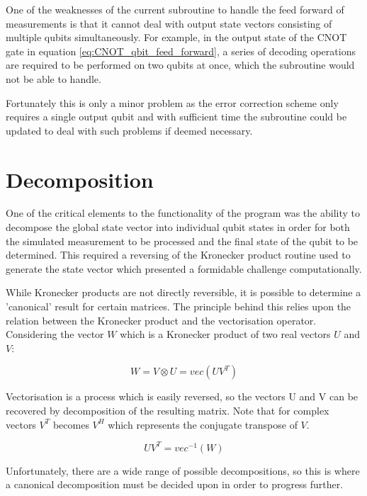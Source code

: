 One of the weaknesses of the current subroutine to handle the feed forward of measurements is that it cannot deal with output state vectors consisting of multiple qubits simultaneously. For example, in the output state of the CNOT gate in equation \eqref{eq:CNOT_qbit_feed_forward}, a series of decoding operations are required to be performed on two qubits at once, which the subroutine would not be able to handle. 

Fortunately this is only a minor problem as the error correction scheme only requires a single output qubit and with sufficient time the subroutine could be updated to deal with such problems if deemed necessary.


\section{Decomposition}

One of the critical elements to the functionality of the program was the ability to decompose the global state vector into individual qubit states in order for both the simulated measurement to be processed and the final state of the qubit to be determined. This required a reversing of the Kronecker product routine used to generate the state vector which presented a formidable challenge computationally.

While Kronecker products are not directly reversible, it is possible to determine a 'canonical' result for certain matrices. The principle behind this relies upon the relation between the Kronecker product and the vectorisation operator. Considering the vector $W$ which is a Kronecker product of two real vectors $U$ and $V$:

\begin{equation}
W = V \otimes U = vec(U V^{T})
\end{equation}

Vectorisation is a process which is easily reversed, so the vectors U and V can be recovered by decomposition of the resulting matrix. Note that for complex vectors $V^{T}$ becomes $V^{H}$ which represents the conjugate transpose of $V$.

\begin{equation}
U V^{T} = vec^{-1} (W)
\end{equation} 

Unfortunately, there are a wide range of possible decompositions, so this is where a canonical decomposition must be decided upon in order to progress further. 

